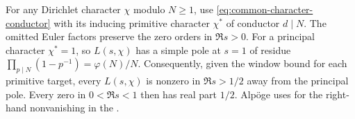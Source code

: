 For any Dirichlet character \(\chi\) modulo \(N\ge1\), use
\eqref{eq:common-character-conductor} with its inducing primitive
character \(\chi^*\) of conductor \(d\mid N\).
The omitted Euler factors preserve the zero orders in \(\Re s>0\).
For a principal character \(\chi^*=1\), so \(L(s,\chi)\) has a simple
pole at \(s=1\) of residue \(\prod_{p\mid N}(1-p^{-1})=\varphi(N)/N\).
Consequently, given the window bound for each primitive target,
every \(L(s,\chi)\) is nonzero in \(\Re s>1/2\) away from the
principal pole. Every zero in \(0<\Re s<1\) then has real part \(1/2\).
Alp\"oge uses
for the right-hand nonvanishing in the
.
\par
